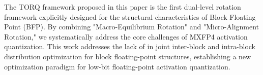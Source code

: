 The TORQ framework proposed in this paper is the first dual-level rotation framework explicitly designed for the structural characteristics of Block Floating Point (BFP). By combining "Macro-Equilibrium Rotation" and "Micro-Alignment Rotation," we systematically address the core challenges of MXFP4 activation quantization. This work addresses the lack of in joint inter-block and intra-block distribution optimization for block floating-point structures, establishing a new optimization paradigm for low-bit floating-point activation quantization.